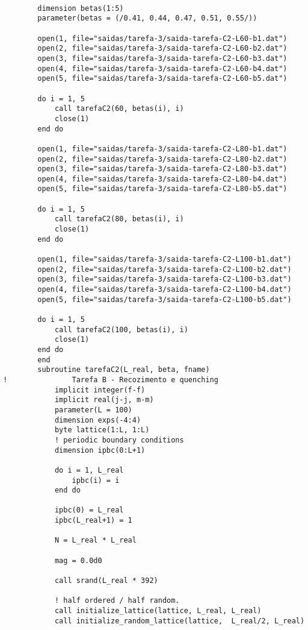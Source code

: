 \begin{verbatim}

        dimension betas(1:5)
        parameter(betas = (/0.41, 0.44, 0.47, 0.51, 0.55/))

        open(1, file="saidas/tarefa-3/saida-tarefa-C2-L60-b1.dat")
        open(2, file="saidas/tarefa-3/saida-tarefa-C2-L60-b2.dat")
        open(3, file="saidas/tarefa-3/saida-tarefa-C2-L60-b3.dat")
        open(4, file="saidas/tarefa-3/saida-tarefa-C2-L60-b4.dat")
        open(5, file="saidas/tarefa-3/saida-tarefa-C2-L60-b5.dat")

        do i = 1, 5
            call tarefaC2(60, betas(i), i)
            close(1)
        end do

        open(1, file="saidas/tarefa-3/saida-tarefa-C2-L80-b1.dat")
        open(2, file="saidas/tarefa-3/saida-tarefa-C2-L80-b2.dat")
        open(3, file="saidas/tarefa-3/saida-tarefa-C2-L80-b3.dat")
        open(4, file="saidas/tarefa-3/saida-tarefa-C2-L80-b4.dat")
        open(5, file="saidas/tarefa-3/saida-tarefa-C2-L80-b5.dat")

        do i = 1, 5
            call tarefaC2(80, betas(i), i)
            close(1)
        end do

        open(1, file="saidas/tarefa-3/saida-tarefa-C2-L100-b1.dat")
        open(2, file="saidas/tarefa-3/saida-tarefa-C2-L100-b2.dat")
        open(3, file="saidas/tarefa-3/saida-tarefa-C2-L100-b3.dat")
        open(4, file="saidas/tarefa-3/saida-tarefa-C2-L100-b4.dat")
        open(5, file="saidas/tarefa-3/saida-tarefa-C2-L100-b5.dat")

        do i = 1, 5
            call tarefaC2(100, betas(i), i)
            close(1)
        end do
        end
        subroutine tarefaC2(L_real, beta, fname)
!               Tarefa B - Recozimento e quenching
            implicit integer(f-f)
            implicit real(j-j, m-m)
            parameter(L = 100)
            dimension exps(-4:4)
            byte lattice(1:L, 1:L)
            ! periodic boundary conditions
            dimension ipbc(0:L+1)

            do i = 1, L_real
                ipbc(i) = i
            end do  

            ipbc(0) = L_real
            ipbc(L_real+1) = 1

            N = L_real * L_real

            mag = 0.0d0

            call srand(L_real * 392)

            ! half ordered / half random.
            call initialize_lattice(lattice, L_real, L_real)
            call initialize_random_lattice(lattice,  L_real/2, L_real)


\end{verbatim}
